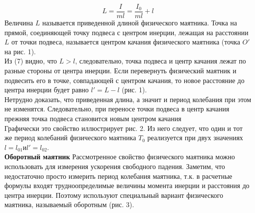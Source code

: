 \documentclass[a4paper]{article}
\begin{document}
\begin{equation}
	L=\dfrac{I}{ml}=\dfrac{I_0}{ml}+l
\end{equation}
Величина $L$ называется приведенной длиной физического маятника. Точка на прямой, соединяющей точку подвеса с центром
инерции, лежащая на расстоянии $L$ от точки подвеса, называется центром качания физического маятника (точка $O'$ на рис. 1).\\
Из (7) видно, что $L>l$, следовательно, точка подвеса и центр
качания лежат по разные стороны от центра инерции.
Если перевернуть физический маятник и подвесить его в точке, совпадающей с центром качания, то новое расстояние до центра инерции будет равно $l'=L-l$ (рис. 1).\\ Нетрудно доказать,
что приведенная длина, а значит и период колебания при этом не
изменятся. Следовательно, при переносе точки подвеса в центр
качания прежняя точка подвеса становится новым центром качания\\
Графически это свойство иллюстрирует рис. 2. Из него следует, что один и тот же период колебаний физического маятника
$T_0$ реализуется при двух значениях $l=l_{01} и l'=l_{02}$.\\

\textbf{Оборотный маятник}
Рассмотренное свойство физического маятника можно использовать для измерения ускорения свободного падения. Заметим,
что недостаточно просто измерить период колебания маятника,
т.к. в расчетные формулы входят трудноопределимые величины момента инерции и расстояния до центра инерции. Поэтому
используют специальный вариант физического маятника, называемый оборотным (рис. 3).
\end{document}
